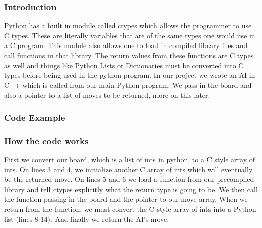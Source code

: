 \documentclass[12pt]{article}
\begin{document}
        \subsubsection{Introduction}
            Python has a built in module called ctypes which allows the programmer
            to use C types. These are literally variables that are of the same types
            one would use in a C program. This module also allows one to load in compiled
            library files and call functions in that library. The return values from these
            functions are C types as well and things like Python Lists or Dictionaries must
            be converted into C types before being used in the python program. In our project
            we wrote an AI in C++ which is called from our main Python program. We pass in
            the board and also a pointer to a list of moves to be returned, more on this
            later.
        \subsubsection{Code Example}
            
        \subsubsection{How the code works}
            First we convert our board, which is a list of ints in python, to a C style array
            of ints. On lines 3 and 4, we initialize another C array of ints which will eventually
            be the returned move. On lines 5 and 6 we load a function from our precompiled library
            and tell ctypes explicitly what the return type is going to be. We then call the function
            passing in the board and the pointer to our move array. When we return from the function,
            we must convert the C style array of ints into a Python list (lines 8-14). And finally
            we return the AI's move.
\end{document}
